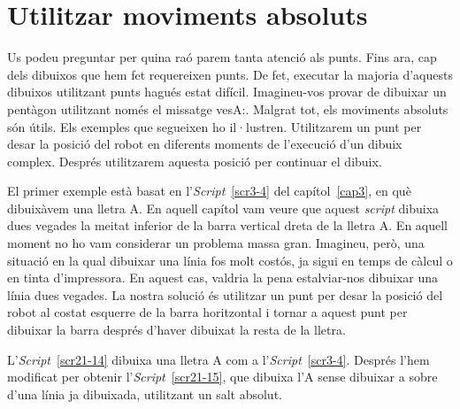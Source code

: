 \section{Utilitzar moviments absoluts}
Us podeu preguntar per quina raó parem tanta atenció als punts. Fins ara, cap dels dibuixos que hem fet requereixen punts. De fet, executar la majoria d'aquests dibuixos utilitzant punts hagués estat difícil. Imagineu-vos provar de dibuixar un pentàgon utilitzant només el missatge \textsf{vesA:}. Malgrat tot, els moviments absoluts són útils. Els exemples que segueixen ho il·lustren. Utilitzarem un punt per desar la posició del robot en diferents moments de l'execució d'un dibuix complex. Després utilitzarem aquesta posició per continuar el dibuix.  

El primer exemple està basat en l'\emph{Script}~\ref{scr3-4} del capítol~\ref{cap3}, en què dibuixàvem una lletra A. En aquell capítol vam veure que aquest \emph{script} dibuixa dues vegades la meitat inferior de la barra vertical dreta de la lletra A. En aquell moment no ho vam considerar un problema massa gran. Imagineu, però, una situació en la qual dibuixar una línia fos molt costós, ja sigui en temps de càlcul o en tinta d'impressora. En aquest cas, valdria la pena estalviar-nos dibuixar una línia dues vegades. La nostra solució és utilitzar un punt per desar la posició del robot al costat esquerre de la barra horitzontal i tornar a aquest punt per dibuixar la barra després d'haver dibuixat la resta de la lletra.

L'\emph{Script}~\ref{scr21-14} dibuixa una lletra A com a l'\emph{Script}~\ref{scr3-4}. Després l'hem modificat per obtenir l'\emph{Script}~\ref{scr21-15}, que dibuixa l'A sense dibuixar a sobre d'una línia ja dibuixada, utilitzant un salt absolut. 


